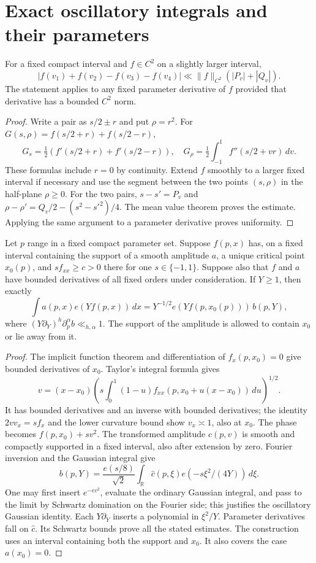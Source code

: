 \section{Exact oscillatory integrals and their parameters}\label{app:phaseproof}

\begin{lemma}\label{lem:smoothpairs}
For a fixed compact interval and $f\in C^2$ on a slightly larger interval,
\[
 |f(v_1)+f(v_2)-f(v_3)-f(v_4)|
 \ll\|f\|_{C^2}(|P_v|+|Q_v|).
\]
The statement applies to any fixed parameter derivative of $f$ provided
that derivative has a bounded $C^2$ norm.
\end{lemma}
\begin{proof}
Write a pair as $s/2\pm r$ and put $\rho=r^2$.
For $G(s,\rho)=f(s/2+r)+f(s/2-r)$,
\[
 G_s=\tfrac12(f'(s/2+r)+f'(s/2-r)),\quad
 G_\rho=\tfrac12\int_{-1}^1 f''(s/2+vr)\,dv.
\]
These formulas include $r=0$ by continuity. Extend $f$ smoothly to a
larger fixed interval if necessary and use the segment between the two
points $(s,\rho)$ in the half-plane $\rho\ge0$.
For the two pairs, $s-s'=P_v$ and
$\rho-\rho'=Q_v/2-(s^2-s'^2)/4$.
The mean value theorem proves the estimate.
Applying the same argument to a parameter derivative proves uniformity.
\end{proof}

\begin{lemma}\label{lem:exactmorse}
Let $p$ range in a fixed compact parameter set. Suppose $f(p,x)$ has,
on a fixed interval containing the support of a smooth amplitude $a$,
a unique critical point $x_0(p)$, and $s f_{xx}\ge c>0$ there for one
$s\in\{-1,1\}$. Suppose also that $f$ and $a$ have bounded derivatives
of all fixed orders under consideration. If $Y\ge1$, then exactly
\[
 \int a(p,x)e(Yf(p,x))\,dx
 =Y^{-1/2}e(Yf(p,x_0(p)))\,b(p,Y),
\]
where $(Y\partial_Y)^h\partial_p^\alpha b\ll_{h,\alpha}1$.
The support of the amplitude is allowed to contain $x_0$ or lie away from it.
\end{lemma}
\begin{proof}
The implicit function theorem and differentiation of $f_x(p,x_0)=0$
give bounded derivatives of $x_0$. Taylor's integral formula gives
\[
 v=(x-x_0)\left(s\int_0^1(1-u)f_{xx}(p,x_0+u(x-x_0))\,du\right)^{1/2}.
\]
It has bounded derivatives and an inverse with bounded derivatives;
the identity $2v v_x=s f_x$ and the lower curvature bound show
$v_x\asymp1$, also at $x_0$. The phase becomes
$f(p,x_0)+s v^2$. The transformed amplitude $c(p,v)$ is smooth and
compactly supported in a fixed interval, also after extension by zero.
Fourier inversion and the Gaussian integral give
\[
 b(p,Y)=\frac{e(s/8)}{\sqrt2}
 \int_{\mathbb R}\widehat c(p,\xi)e(-s\xi^2/(4Y))\,d\xi.
\]
One may first insert $e^{-\epsilon v^2}$, evaluate the ordinary Gaussian
integral, and pass to the limit by Schwartz domination on the Fourier
side; this justifies the oscillatory Gaussian identity.
Each $Y\partial_Y$ inserts a polynomial in $\xi^2/Y$.
Parameter derivatives fall on $\widehat c$. Its Schwartz bounds prove
all the stated estimates. The construction uses an interval containing both the support and $x_0$.
It also covers the case $a(x_0)=0$.
\end{proof}

